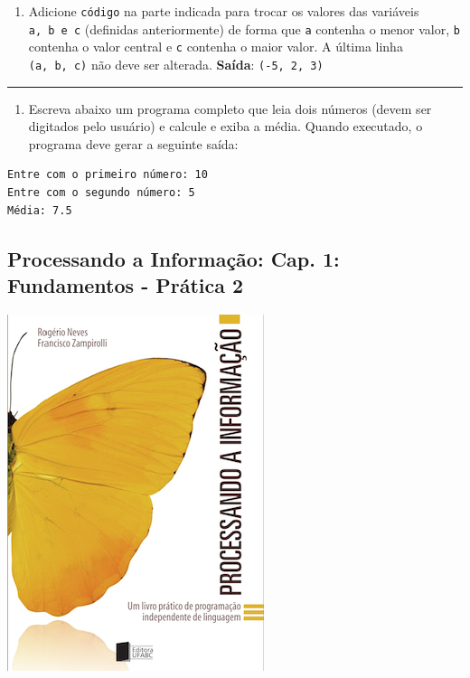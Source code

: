 \documentclass[12pt,a4paper]{article}
\providecommand{\tightlist}{%
      \setlength{\itemsep}{0pt}\setlength{\parskip}{0pt}}
\begin{document}
\begin{enumerate}
\def\labelenumi{\arabic{enumi}.}
\setcounter{enumi}{3}
\tightlist
\item
  Adicione \texttt{código} na parte indicada para trocar os valores das
  variáveis \texttt{a,\ b\ e\ c} (definidas anteriormente) de forma que
  \texttt{a} contenha o menor valor, \texttt{b} contenha o valor central
  e \texttt{c} contenha o maior valor. A última linha
  \texttt{(a,\ b,\ c)} não deve ser alterada. \textbf{Saída}:
  \texttt{(-5,\ 2,\ 3)}
\end{enumerate}

    \begin{center}\rule{0.5\linewidth}{0.5pt}\end{center}

\begin{enumerate}
\def\labelenumi{\arabic{enumi}.}
\setcounter{enumi}{4}
\tightlist
\item
  Escreva abaixo um programa completo que leia dois números (devem ser
  digitados pelo usuário) e calcule e exiba a média. Quando executado, o
  programa deve gerar a seguinte saída:
\end{enumerate}

\begin{verbatim}
Entre com o primeiro número: 10
Entre com o segundo número: 5
Média: 7.5
\end{verbatim}

    \hypertarget{processando-a-informauxe7uxe3o-cap.-1-fundamentos---pruxe1tica-2}{%
\subsection{Processando a Informação: Cap. 1: Fundamentos - Prática
2}\label{processando-a-informauxe7uxe3o-cap.-1-fundamentos---pruxe1tica-2}}

    \includegraphics{"figs/Capa_Processando_Informacao.jpg"}
\end{document}
